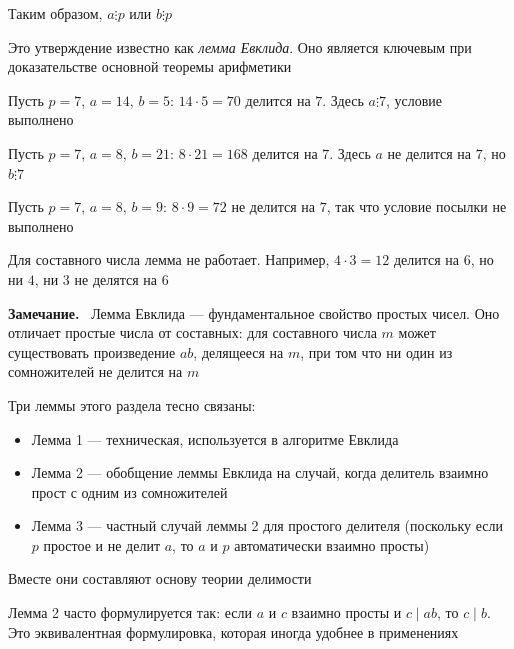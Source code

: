 \documentclass[a4paper,12pt]{article}
\newcommand{\myremark}{\textbf{Замечание.}\ }
\theoremstyle{definition}
\theoremstyle{plain}
\theoremstyle{remark}
\begin{document}
	Таким образом, $a \vdots p$ или $b \vdots p$
	
	\begin{tcolorbox}[colback=red!5, colframe=red!70!black, title=Лемма Евклида]
	Это утверждение известно как \textit{лемма Евклида}. Оно является ключевым при доказательстве основной теоремы арифметики
	\end{tcolorbox}
	
	\begin{tcolorbox}[colback=gray!5, colframe=gray!50, title=Пример]
	Пусть $p = 7$, $a = 14$, $b = 5$: $14 \cdot 5 = 70$ делится на $7$. Здесь $a \vdots 7$, условие выполнено
	
	Пусть $p = 7$, $a = 8$, $b = 21$: $8 \cdot 21 = 168$ делится на $7$. Здесь $a$ не делится на $7$, но $b \vdots 7$
	
	Пусть $p = 7$, $a = 8$, $b = 9$: $8 \cdot 9 = 72$ не делится на $7$, так что условие посылки не выполнено
	\end{tcolorbox}
	
	\begin{tcolorbox}[colback=blue!5, colframe=blue!40!black, title=Контрпример для составного числа]
	Для составного числа лемма не работает. Например, $4 \cdot 3 = 12$ делится на $6$, но ни $4$, ни $3$ не делятся на $6$
	\end{tcolorbox}
	
	\myremark
	Лемма Евклида — фундаментальное свойство простых чисел. Оно отличает простые числа от составных: для составного числа $m$ может существовать произведение $ab$, делящееся на $m$, при том что ни один из сомножителей не делится на $m$
	
	\begin{tcolorbox}[colback=purple!5, colframe=purple!50!black, title=Заметочка: Связь лемм]
	Три леммы этого раздела тесно связаны:
	\begin{itemize}
	\item Лемма 1 — техническая, используется в алгоритме Евклида
	\item Лемма 2 — обобщение леммы Евклида на случай, когда делитель взаимно прост с одним из сомножителей
	\item Лемма 3 — частный случай леммы 2 для простого делителя (поскольку если $p$ простое и не делит $a$, то $a$ и $p$ автоматически взаимно просты)
	\end{itemize}
	Вместе они составляют основу теории делимости
	\end{tcolorbox}
	
	\begin{tcolorbox}[colback=yellow!5, colframe=orange!60!black, title=Важное замечание]
	Лемма 2 часто формулируется так: если $a$ и $c$ взаимно просты и $c \mid ab$, то $c \mid b$. Это эквивалентная формулировка, которая иногда удобнее в применениях
	\end{tcolorbox}
	
\end{document}
